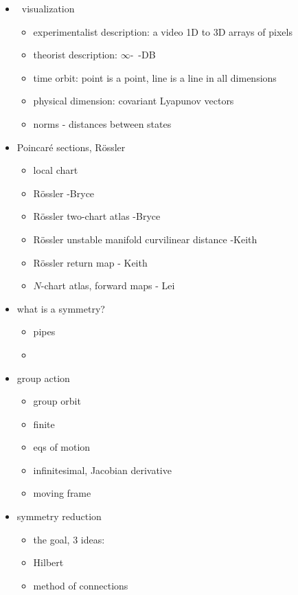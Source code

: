\begin{itemize}
  \item \statesp\ visualization
    \begin{itemize}
      \item experimentalist description: a video 1D to 3D arrays of pixels
      \item theorist description: $\infty$-\dmn\ \statesp -DB
      \item time orbit: point is a point, line is a line in all dimensions
      \item physical dimension: covariant Lyapunov vectors
      \item norms - distances between states
    \end{itemize}
  \item Poincar\'e sections, R\"ossler
    \begin{itemize}
      \item local chart
      \item R\"ossler {\poincBord} -Bryce
      \item R\"ossler two-chart atlas -Bryce
      \item R\"ossler unstable manifold curvilinear distance -Keith
      \item R\"ossler return map - Keith
      \item $N$-chart atlas, forward maps - Lei
    \end{itemize}
  \item what is a symmetry?
    \begin{itemize}
      \item pipes
      \item \cLe
    \end{itemize}
  \item group action
    \begin{itemize}
      \item group orbit
      \item finite
      \item eqs of motion
      \item infinitesimal, Jacobian derivative
      \item moving frame
    \end{itemize}
  \item symmetry reduction
    \begin{itemize}
      \item the goal, 3 ideas:
      \item Hilbert
      \item method of connections

\end{itemize}
\end{itemize}
